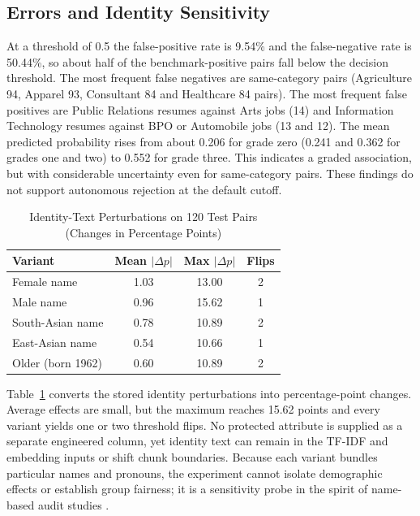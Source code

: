 \documentclass[conference]{IEEEtran}
\begin{document}
\subsection{Errors and Identity Sensitivity}
At a threshold of 0.5 the false-positive rate is 9.54\% and the false-negative rate is 50.44\%, so about half of the benchmark-positive pairs fall below the decision threshold. The most frequent false negatives are same-category pairs (Agriculture 94, Apparel 93, Consultant 84 and Healthcare 84 pairs). The most frequent false positives are Public Relations resumes against Arts jobs (14) and Information Technology resumes against BPO or Automobile jobs (13 and 12). The mean predicted probability rises from about 0.206 for grade zero (0.241 and 0.362 for grades one and two) to 0.552 for grade three. This indicates a graded association, but with considerable uncertainty even for same-category pairs. These findings do not support autonomous rejection at the default cutoff.

\begin{table}[!t]
\caption{Identity-Text Perturbations on 120 Test Pairs (Changes in Percentage Points)}
\label{tab:identity}
\centering
\small
\begin{tabular}{@{}lccc@{}}
\toprule
Variant & Mean $|\Delta p|$ & Max $|\Delta p|$ & Flips \\
\midrule
Female name & 1.03 & 13.00 & 2 \\
Male name & 0.96 & 15.62 & 1 \\
South-Asian name & 0.78 & 10.89 & 2 \\
East-Asian name & 0.54 & 10.66 & 1 \\
Older (born 1962) & 0.60 & 10.89 & 2 \\
\bottomrule
\end{tabular}
\end{table}

Table~\ref{tab:identity} converts the stored identity perturbations into percentage-point changes. Average effects are small, but the maximum reaches 15.62 points and every variant yields one or two threshold flips. No protected attribute is supplied as a separate engineered column, yet identity text can remain in the TF-IDF and embedding inputs or shift chunk boundaries. Because each variant bundles particular names and pronouns, the experiment cannot isolate demographic effects or establish group fairness; it is a sensitivity probe in the spirit of name-based audit studies \cite{b12}.
\end{document}
